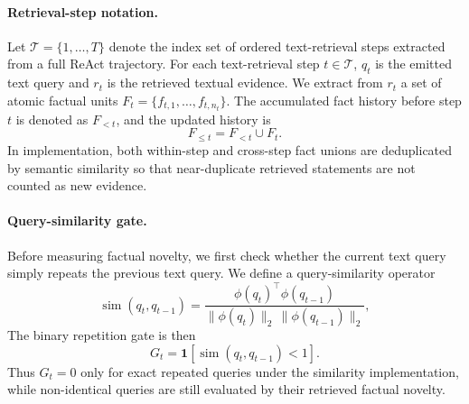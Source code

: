 \documentclass{article} %
\newcommand{\query}{q}
\newcommand{\facts}{F}
\begin{document}
\paragraph{Retrieval-step notation.}
Let $\mathcal{T}=\{1,\ldots,T\}$ denote the index set of ordered text-retrieval steps extracted from a full ReAct trajectory.
For each text-retrieval step $t\in\mathcal{T}$, $\query_t$ is the emitted text query and $r_t$ is the retrieved textual evidence.
We extract from $r_t$ a set of atomic factual units $\facts_t=\{f_{t,1},\ldots,f_{t,n_t}\}$.
The accumulated fact history before step $t$ is denoted as $\facts_{<t}$, and the updated history is
\begin{equation}
    \facts_{\leq t} = \facts_{<t} \cup \facts_t.
\end{equation}
In implementation, both within-step and cross-step fact unions are deduplicated by semantic similarity so that near-duplicate retrieved statements are not counted as new evidence.

\paragraph{Query-similarity gate.}
Before measuring factual novelty, we first check whether the current text query simply repeats the previous text query.
We define a query-similarity operator
\begin{equation}
    \operatorname{sim}(\query_t,\query_{t-1})
    =
    \frac{
    \phi(\query_t)^\top \phi(\query_{t-1})
    }{
    \|\phi(\query_t)\|_2 \, \|\phi(\query_{t-1})\|_2
    },
\end{equation}
The binary repetition gate is then
\begin{equation}
    G_t = \mathbf{1}\!\left[\operatorname{sim}(\query_t,\query_{t-1}) < 1\right].
\end{equation}
Thus $G_t=0$ only for exact repeated queries under the similarity implementation, while non-identical queries are still evaluated by their retrieved factual novelty.
\end{document}

